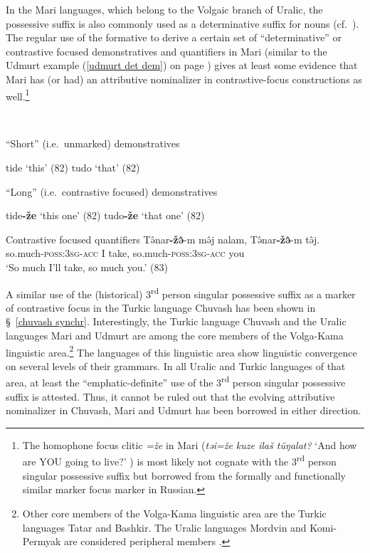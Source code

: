 In the Mari languages, which belong to the Volgaic branch of Uralic, the possessive suffix is also commonly used as a determinative suffix for nouns (cf.~\citealt[75–76]{alhoniemi1993}). The regular use of the formative to derive a certain set of “determinative” or contrastive focused demonstratives and quantifiers in Mari (similar to the Udmurt example (\ref{udmurt det dem}) on page \pageref{udmurt det dem}) gives at least some evidence that Mari has (or had) an attributive nominalizer in contrastive-focus constructions as well.\footnote{The homophone focus clitic \textit{=že} in Mari (\textit{təi=že kuze ilaš tüŋalat?} ‘And how are YOU going to live?’ \citealt[80]{alhoniemi1993}) is most likely not cognate with the 3\textsuperscript{rd} person singular possessive suffix but borrowed from the formally and functionally similar marker focus marker in Russian.}%
\begin{exe}
\ex {}\\%
\begin{xlist}
\ex “Short” (i.e.~unmarked) demonstratives 
\begin{xlist}
\ex tide ‘this’ (82)
\ex tudo ‘that’ (82)
\end{xlist}
\ex “Long” (i.e.~contrastive focused) demonstratives 
\begin{xlist}
\ex tide\textbf{-že} ‘this one’ (82)
\ex tudo\textbf{-že} ‘that one’ (82)
\end{xlist}
\ex Contrastive focused quantifiers
\gll	Tə̂nar\textbf{-žə̂}-m mə̂j nalam, Tə̂nar\textbf{-žə̂}-m tə̂j.\\
	so.much-\textsc{poss:3sg}-\textsc{acc} I take, so.much-\textsc{poss:3sg}-\textsc{acc} you\\
\glt	‘So much I'll take, so much you.’ (83)
\end{xlist}
\end{exe}
A similar use of the (historical) 3\textsuperscript{rd} person singular possessive suffix as a marker of contrastive focus in the Turkic language Chuvash has been shown in \S~\ref{chuvash synchr}. Interestingly, the Turkic language Chuvash and the Uralic languages Mari and Udmurt are among the core members of the Volga-Kama linguistic area.\footnote{Other core members of the Volga-Kama linguistic area are the Turkic languages Tatar and Bashkir. The Uralic languages Mordvin and Komi-Permyak are considered peripheral members \citep{helimski2005}.} The languages of this linguistic area show linguistic convergence on several levels of their grammars. In all Uralic and Turkic languages of that area, at least the “emphatic-definite” use of the 3\textsuperscript{rd} person singular possessive suffix is attested. Thus, it cannot be ruled out that the evolving attributive nominalizer in Chuvash, Mari and Udmurt has been borrowed in either direction.%

